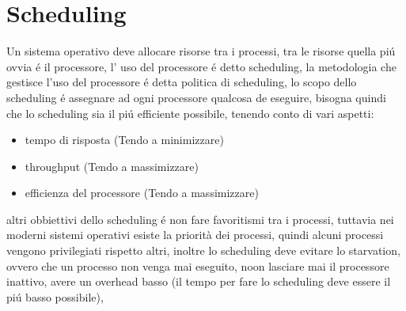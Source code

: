 \section{Scheduling}
Un sistema operativo deve allocare risorse tra i processi, tra le risorse quella piú ovvia é il processore, l' uso del
    processore é detto scheduling, la metodologia che gestisce l'uso del processore é detta politica di scheduling,
    lo scopo dello scheduling é assegnare ad ogni processore qualcosa de eseguire, bisogna quindi che lo scheduling
    sia il piú efficiente possibile, tenendo conto di vari aspetti:
    \begin{itemize}
        \item tempo di risposta (Tendo a minimizzare)
        \item throughput (Tendo a massimizzare)
        \item efficienza del processore (Tendo a massimizzare)
    \end{itemize}
    altri obbiettivi dello scheduling é non fare favoritismi tra i processi, tuttavia nei moderni sistemi operativi
    esiste la priorità dei processi, quindi alcuni processi vengono privilegiati rispetto altri, inoltre lo scheduling
    deve evitare lo starvation, ovvero che un processo non venga mai eseguito, noon lasciare mai il processore inattivo,
    avere un overhead basso (il tempo per fare lo scheduling deve essere il piú basso possibile),
